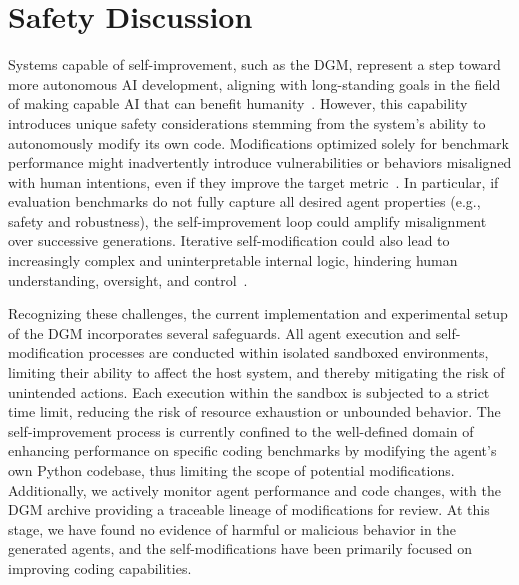 \section{Safety Discussion}
\label{sec:safety}

Systems capable of self-improvement, such as the DGM, represent a step toward more autonomous AI development, aligning with long-standing goals in the field of making capable AI that can benefit humanity~\citep{schmidhuber1987evolutionary, clune2019ai, markoff2016machines, lehman2023machine}. However, this capability introduces unique safety considerations stemming from the system's ability to autonomously modify its own code. Modifications optimized solely for benchmark performance might inadvertently introduce vulnerabilities or behaviors misaligned with human intentions, even if they improve the target metric~\citep{bostrom2020ethical}. In particular, if evaluation benchmarks do not fully capture all desired agent properties (e.g., safety and robustness), the self-improvement loop could amplify misalignment over successive generations. Iterative self-modification could also lead to increasingly complex and uninterpretable internal logic, hindering human understanding, oversight, and control~\citep{sheth2025safety, anwar2024foundational, greenblatt2024alignment, ganguli2022red}.

Recognizing these challenges, the current implementation and experimental setup of the DGM incorporates several safeguards. All agent execution and self-modification processes are conducted within isolated sandboxed environments, limiting their ability to affect the host system, and thereby mitigating the risk of unintended actions. Each execution within the sandbox is subjected to a strict time limit, reducing the risk of resource exhaustion or unbounded behavior. The self-improvement process is currently confined to the well-defined domain of enhancing performance on specific coding benchmarks by modifying the agent's own Python codebase, thus limiting the scope of potential modifications. Additionally, we actively monitor agent performance and code changes, with the DGM archive providing a traceable lineage of modifications for review. At this stage, we have found no evidence of harmful or malicious behavior in the generated agents, and the self-modifications have been primarily focused on improving coding capabilities.

